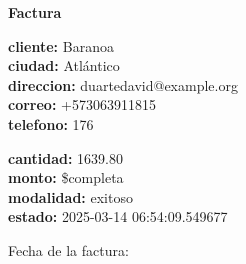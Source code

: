 \documentclass{article}
\begin{document}
\begin{center}
    {\LARGE \textbf{Factura}}\\[1cm]
\end{center}

\textbf{cliente:} Baranoa \\
\textbf{ciudad:} Atlántico \\
\textbf{direccion:} duartedavid@example.org \\
\textbf{correo:} +573063911815 \\
\textbf{telefono:} 176 \\

\vspace{0.5cm}

\textbf{cantidad:} 1639.80 \\
\textbf{monto:} \$completa \\
\textbf{modalidad:} exitoso \\
\textbf{estado:} 2025-03-14 06:54:09.549677 \\

\vspace{1cm}

Fecha de la factura: 
\end{document}
